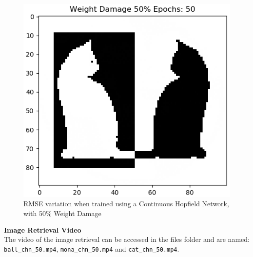 \documentclass[12pt,a4paper]{article}
\newcommand{\noi}{\noindent}
\def\tt#1{\texttt{#1}}
\begin{document}
\begin{figure}[H]
\includegraphics[scale=0.34]{images/cat_chn_50_end.png}
\caption{RMSE variation when trained using a Continuous Hopfield Network, with 50\% Weight Damage}
\end{figure}

\noi
\textbf{Image Retrieval Video}\\
The video of the image retrieval can be accessed in the files folder and are named: \tt{ball\_chn\_50.mp4}, \tt{mona\_chn\_50.mp4} and \tt{cat\_chn\_50.mp4}.
\end{document}

